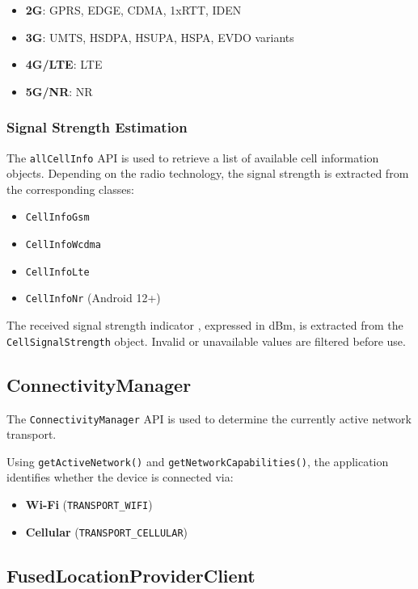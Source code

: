 \documentclass{article}
\theoremstyle{plain}
\theoremstyle{definition}
\theoremstyle{remark}
\begin{document}
\begin{itemize}
    \item \textbf{2G}: GPRS, EDGE, CDMA, 1xRTT, IDEN
    \item \textbf{3G}: UMTS, HSDPA, HSUPA, HSPA, EVDO variants
    \item \textbf{4G/LTE}: LTE
    \item \textbf{5G/NR}: NR
\end{itemize}


\subsubsection{Signal Strength Estimation}

The \texttt{allCellInfo} API is used to retrieve a list of available cell information objects. Depending on the radio technology, the signal strength is extracted from the corresponding classes:

\begin{itemize}
    \item \texttt{CellInfoGsm}
    \item \texttt{CellInfoWcdma}
    \item \texttt{CellInfoLte}
    \item \texttt{CellInfoNr} (Android 12+)
\end{itemize}

The received signal strength indicator , expressed in dBm, is extracted from the \texttt{CellSignalStrength} object. Invalid or unavailable values are filtered before use.

\subsection{ConnectivityManager}

The \texttt{ConnectivityManager} API is used to determine the currently active network transport.

Using \texttt{getActiveNetwork()} and \texttt{getNetworkCapabilities()}, the application identifies whether the device is connected via:

\begin{itemize}
    \item \textbf{Wi-Fi} (\texttt{TRANSPORT\_WIFI})
    \item \textbf{Cellular} (\texttt{TRANSPORT\_CELLULAR})
\end{itemize}


\subsection{FusedLocationProviderClient}
\end{document}

